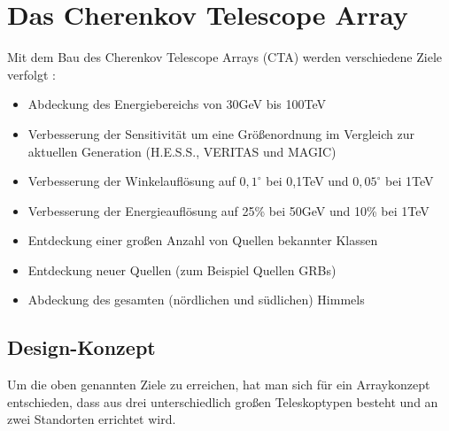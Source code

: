 \chapter{Das Cherenkov Telescope Array}
\label{ch:CTA}
Mit dem Bau des Cherenkov Telescope Arrays (CTA) werden verschiedene Ziele verfolgt \cite{NextGen}:
\begin{itemize}

\item Abdeckung des Energiebereichs von 30GeV bis 100TeV
\item Verbesserung der Sensitivität um eine Größenordnung im Vergleich zur aktuellen Generation (H.E.S.S., VERITAS und MAGIC)
\item Verbesserung der Winkelauflösung auf $0,1^{\circ}$ bei 0,1TeV und $0,05^{\circ}$ bei 1TeV
\item Verbesserung der Energieauflösung auf 25\% bei 50GeV und 10\% bei 1TeV
\item Entdeckung einer großen Anzahl von Quellen bekannter Klassen
\item Entdeckung neuer Quellen (zum Beispiel Quellen GRBs)
\item Abdeckung des gesamten (nördlichen und südlichen) Himmels
\end{itemize}

\section{Design-Konzept}
Um die oben genannten Ziele zu erreichen, hat man sich für ein Arraykonzept entschieden, dass aus drei unterschiedlich großen Teleskoptypen besteht und an zwei Standorten errichtet wird.

